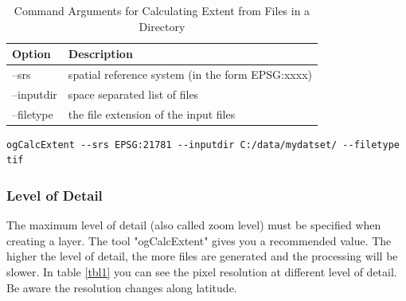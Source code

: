 \documentclass[
	12pt,
	a4paper,
	english,	
	appendixprefix,				     			        
	openany,		     	
	abstracton,		    		    
 	BCOR8mm,		    
]{scrartcl}
\begin{document}
\begin{table}[H]
\centering
\begin{tabular}{|l|p{6cm}|}
\hline
\textbf{Option}	& \textbf{Description}\\
\hline
--srs   & spatial reference system (in the form EPSG:xxxx)\\
\hline
--inputdir & space separated list of files\\
\hline
--filetype & the file extension of the input files\\
\hline
\end{tabular}
\caption{Command Arguments for Calculating Extent from Files in a Directory}
\end{table}

\begin{lstlisting}
ogCalcExtent --srs EPSG:21781 --inputdir C:/data/mydatset/ --filetype tif
\end{lstlisting}

\subsubsection{Level of Detail}\label{lod}

The maximum level of detail (also called zoom level) must be specified when creating a layer. The tool "ogCalcExtent" gives you a recommended value. The higher the level of detail, the more files are generated and the processing will be slower. In table \ref{tbl1} you can see the pixel resolution at different level of detail. Be aware the resolution changes along latitude.
\end{document}
